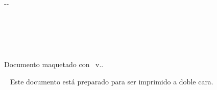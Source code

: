 {\begin{cambiamargen}{-\cambioIzquierdo}{-\cambioDerecho}
\begin{large}
\begin{center}
\textbf{\autorPortadaVal}\\[0.3cm]

\textbf{\institucionVal}\\[1em]
\textbf{\fechaPublicacionVal}

\end{center}

\end{large}

\vfill

\end{cambiamargen}

\newpage

\thispagestyle{empty}
\mbox{ }
\vfill%
\begin{small} 
\begin{center}
\ifx\noTeXiSCreditsVal\undefined
  Documento maquetado con \texis\ v.\texisVer.
\else
\mbox{ }
\fi
\end{center}
\end{small}
\vspace*{2cm}
\begin{small} 
\begin{center}
\ifx\explicacionDobleCaraVal\undefined
\mbox{ }
\else
\noindent Este documento está preparado para ser imprimido a doble
cara.
\fi
\end{center}
\end{small}


\newpage

\thispagestyle{empty}

\mbox{ }

\begin{Huge}
\begin{center}
\tituloPortadaVal
\end{center}
\end{Huge}

\vfill

\begin{large}
\begin{center}
\textoPrimerSubtituloPortadaVal
\\ \mbox{ } \\ \mbox{ } \\ 
\textoSegundoSubtituloPortadaVal \\ [0.3em]
\end{center}
\end{large}

}
